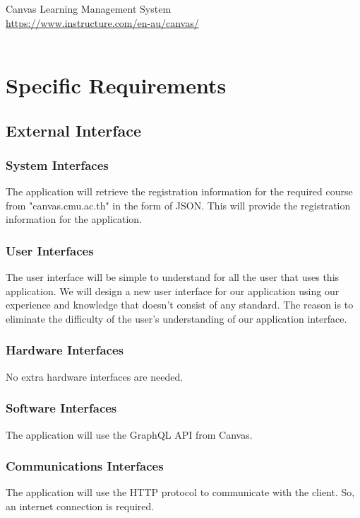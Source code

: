 \documentclass[ 10pt]{report}
\begin{document}
    \noindent Canvas Learning Management System \\
    \href{https://www.instructure.com/en-au/canvas/}{https://www.instructure.com/en-au/canvas/} \\\\
    \pagebreak

    \chapter{Specific Requirements}
        \section{External Interface}
            \subsection{System Interfaces}
            The application will retrieve the registration information for the required course from "canvas.cmu.ac.th" in the form of JSON. This will provide the registration information for the application.
            \subsection{User Interfaces}
            The user interface will be simple to understand for all the user that uses this application. We will design a new user interface for our application using our experience and knowledge that doesn't consist of any standard. The reason is to eliminate the difficulty of the user's understanding of our application interface. 
            \subsection{Hardware Interfaces}
            No extra hardware interfaces are needed.
            \subsection{Software Interfaces}
            The application will use the GraphQL API from Canvas.
            \subsection{Communications Interfaces}
            The application will use the HTTP protocol to communicate with the client. So, an internet connection is required.
\end{document}
